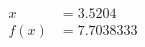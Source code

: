 \documentclass[preview]{standalone}
\begin{document}
\begin{align*}
x &= 3.5204\\f(x) &= 7.7038333
\end{align*}
\end{document}
